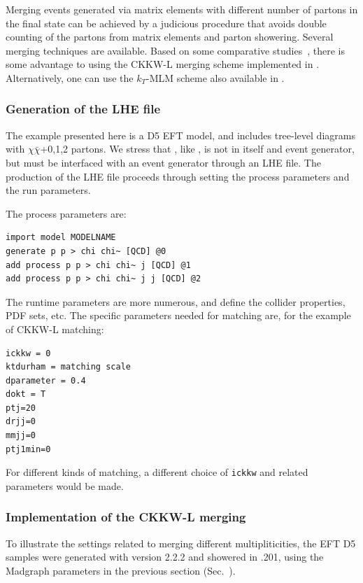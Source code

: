 Merging events generated via matrix elements with different number of partons in the final state can be achieved by a judicious procedure that  avoids double counting of the partons from matrix elements and parton showering.
Several merging techniques are available. Based on some comparative studies \,\cite{Alwall:0706.2569}, there is some advantage to using the CKKW-L merging scheme \cite{Lonnblad:2011xx} implemented in \pythiaEight.  Alternatively, one can use the $k_T$-MLM scheme also available in \pythiaEight.

\subsubsection{Generation of the LHE file}
\label{sub:MadgraphParameters}

The example presented here is a D5 EFT model, and
includes tree-level diagrams with $\chi\bar\chi$+0,1,2 partons.
We stress that \madgraph, like \powheg, is not in itself and event generator, but must be interfaced 
with an event generator through an LHE file.  The production of the LHE file proceeds through setting the 
process parameters and the run parameters.

The process parameters are:
\begin{verbatim}
import model MODELNAME
generate p p > chi chi~ [QCD] @0
add process p p > chi chi~ j [QCD] @1
add process p p > chi chi~ j j [QCD] @2
\end{verbatim}

The runtime parameters are more numerous, and define the
collider properties, PDF sets, etc.   The specific parameters
needed for matching are, for the example of CKKW-L matching:
\begin{verbatim}
ickkw = 0
ktdurham = matching scale
dparameter = 0.4
dokt = T
ptj=20
drjj=0
mmjj=0
ptj1min=0
\end{verbatim}
For different kinds of matching, a different choice of \texttt{ickkw} and
related parameters would be made.


\subsubsection{Implementation of the CKKW-L merging}
\label{sec:match_implementation}
To illustrate the settings related to merging different multipliticities, the EFT D5 samples were generated with \madgraph version 2.2.2 and showered in \pythiaEight.201, using the Madgraph parameters in the previous section (Sec.~\cite{sub:MadgraphParameters}).


